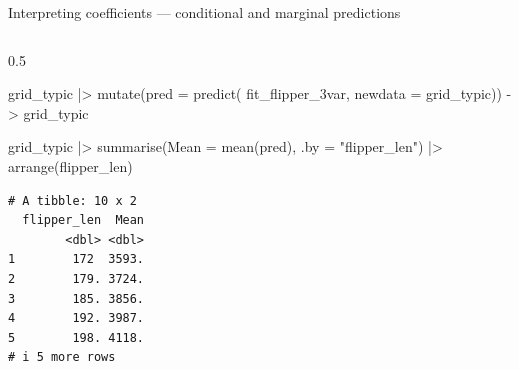 \documentclass[
  10pt,
  ignorenonframetext,
  aspectratio=169,
  t]{beamer}
\newenvironment{Shaded}{\begin{snugshade}}{\end{snugshade}}
\newcommand{\AttributeTok}[1]{\textcolor[rgb]{0.40,0.45,0.13}{#1}}
\newcommand{\FunctionTok}[1]{\textcolor[rgb]{0.28,0.35,0.67}{#1}}
\newcommand{\NormalTok}[1]{\textcolor[rgb]{0.00,0.23,0.31}{#1}}
\newcommand{\OtherTok}[1]{\textcolor[rgb]{0.00,0.23,0.31}{#1}}
\newcommand{\SpecialCharTok}[1]{\textcolor[rgb]{0.37,0.37,0.37}{#1}}
\newcommand{\StringTok}[1]{\textcolor[rgb]{0.13,0.47,0.30}{#1}}
\begin{document}
\begin{frame}[fragile]{Interpreting coefficients --- conditional and
marginal predictions}
\begin{columns}[T]
\begin{column}{0.5\linewidth}
\begin{Shaded}
\begin{Highlighting}[]
\NormalTok{grid\_typic }\SpecialCharTok{|\textgreater{}} 
  \FunctionTok{mutate}\NormalTok{(}\AttributeTok{pred =} \FunctionTok{predict}\NormalTok{(}
\NormalTok{    fit\_flipper\_3var,}
    \AttributeTok{newdata =}\NormalTok{ grid\_typic)) }\OtherTok{{-}\textgreater{}}\NormalTok{ grid\_typic}

\NormalTok{grid\_typic }\SpecialCharTok{|\textgreater{}} 
  \FunctionTok{summarise}\NormalTok{(}\AttributeTok{Mean =} \FunctionTok{mean}\NormalTok{(pred), }\AttributeTok{.by =} \StringTok{"flipper\_len"}\NormalTok{) }\SpecialCharTok{|\textgreater{}} 
  \FunctionTok{arrange}\NormalTok{(flipper\_len)}
\end{Highlighting}
\end{Shaded}

\begin{verbatim}
# A tibble: 10 x 2
  flipper_len  Mean
        <dbl> <dbl>
1        172  3593.
2        179. 3724.
3        185. 3856.
4        192. 3987.
5        198. 4118.
# i 5 more rows
\end{verbatim}

\normalsize
\end{column}
\end{columns}
\end{frame}
\end{document}
